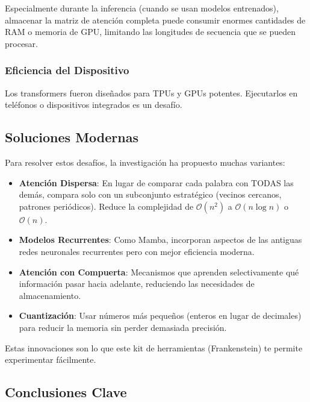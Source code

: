 Especialmente durante la inferencia (cuando se usan modelos entrenados), almacenar la matriz de atención completa puede consumir enormes cantidades de RAM o memoria de GPU, limitando las longitudes de secuencia que se pueden procesar.

\subsubsection{Eficiencia del Dispositivo}

Los transformers fueron diseñados para TPUs y GPUs potentes. Ejecutarlos en teléfonos o dispositivos integrados es un desafío.

\subsection{Soluciones Modernas}

Para resolver estos desafíos, la investigación ha propuesto muchas variantes:

\begin{itemize}[leftmargin=*]
    \item \textbf{Atención Dispersa}: En lugar de comparar cada palabra con TODAS las demás, compara solo con un subconjunto estratégico (vecinos cercanos, patrones periódicos). Reduce la complejidad de $\mathcal{O}(n^2)$ a $\mathcal{O}(n \log n)$ o $\mathcal{O}(n)$.
    \item \textbf{Modelos Recurrentes}: Como Mamba, incorporan aspectos de las antiguas redes neuronales recurrentes pero con mejor eficiencia moderna.
    \item \textbf{Atención con Compuerta}: Mecanismos que aprenden selectivamente qué información pasar hacia adelante, reduciendo las necesidades de almacenamiento.
    \item \textbf{Cuantización}: Usar números más pequeños (enteros en lugar de decimales) para reducir la memoria sin perder demasiada precisión.
\end{itemize}

Estas innovaciones son lo que este kit de herramientas (Frankenstein) te permite experimentar fácilmente.

\subsection{Conclusiones Clave}

